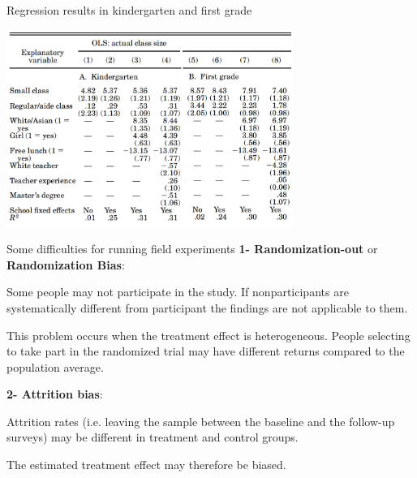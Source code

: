\documentclass{beamer}
\begin{document}
\begin{frame}{Regression results in kindergarten and first grade}
\vspace{-5pt}
\begin{center}
\includegraphics[width=0.7\textwidth]{./Figures/krueger.png}
\end{center}

\end{frame}


\begin{frame}{Some difficulties for running field experiments}
\textbf{1- Randomization-out} or \textbf{Randomization Bias}:\medskip

Some people may not participate in the study. If nonparticipants are systematically different from participant the findings are not applicable to them.\bigskip

This problem occurs when the treatment effect is heterogeneous. %
People selecting to take part in the randomized trial
may have different returns compared to the population average.\bigskip

\textbf{2- Attrition bias}:\medskip

Attrition rates (i.e. leaving the sample between the baseline and the follow-up surveys) may be different in treatment and control groups.

The estimated treatment effect may therefore be biased.
\end{frame}
\end{document}
